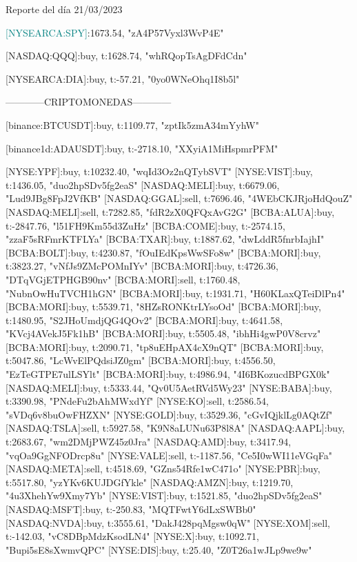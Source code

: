 \documentclass[a4paper]{article}
\begin{document}
Reporte del día 21/03/2023

\begin{tcolorbox}[title=Índices]

\textcolor{teal}{ [NYSEARCA:SPY]}:1673.54, "zA4P57Vyxl3WvP4E"

[NASDAQ:QQQ]:buy, t:1628.74, "whRQopTsAgDFdCdn"

[NYSEARCA:DIA]:buy, t:-57.21, "0yo0WNeOhq1I8b5l"

\end{tcolorbox}

------------CRIPTOMONEDAS------------

[binance:BTCUSDT]:buy, t:1109.77, "zptIk5zmA34mYyhW"

[binance1d:ADAUSDT]:buy, t:-2718.10, "XXyiA1MiHspmrPFM"

[NYSE:YPF]:buy, t:10232.40, "wqId3Oz2nQTybSVT"
[NYSE:VIST]:buy, t:1436.05, "duo2hpSDv5fg2eaS"
[NASDAQ:MELI]:buy, t:6679.06, "Lud9JBg8FpJ2VfKB"
[NASDAQ:GGAL]:sell, t:7696.46, "4WEbCKJRjoHdQouZ"
[NASDAQ:MELI]:sell, t:7282.85, "fdR2zX0QFQxAvG2G"
[BCBA:ALUA]:buy, t:-2847.76, "l51FH9Km55d3ZuHz"
[BCBA:COME]:buy, t:-2574.15, "zzaF5sRFmrKTFLYa"
[BCBA:TXAR]:buy, t:1887.62, "dwLddR5fnrbIajhI"
[BCBA:BOLT]:buy, t:4230.87, "fOuIEdKpsWwSFo8w"
[BCBA:MORI]:buy, t:3823.27, "vNfJs9ZMcPOMnIYv"
[BCBA:MORI]:buy, t:4726.36, "DTqVGjETPHGB90nv"
[BCBA:MORI]:sell, t:1760.48, "NubnOwHuTVCH1hGN"
[BCBA:MORI]:buy, t:1931.71, "H60KLaxQTeiDlPn4"
[BCBA:MORI]:buy, t:5539.71, "8HZsRONKtrLYsoOd"
[BCBA:MORI]:buy, t:1480.95, "S2JHoUmdjQG4QOv2"
[BCBA:MORI]:buy, t:4641.58, "KVcj4AVekJ5Fk1hB"
[BCBA:MORI]:buy, t:5505.48, "ibhHi4gwP0V8crvz"
[BCBA:MORI]:buy, t:2090.71, "tp8uEHpAX4cX9nQT"
[BCBA:MORI]:buy, t:5047.86, "LcWvElPQdsiJZ0gm"
[BCBA:MORI]:buy, t:4556.50, "EzTeGTPE7ulLSYlt"
[BCBA:MORI]:buy, t:4986.94, "4I6BKozucdBPGX0k"
[NASDAQ:MELI]:buy, t:5333.44, "Qv0U5AetRVd5Wy23"
[NYSE:BABA]:buy, t:3390.98, "PNdeFu2bAhMWxdYf"
[NYSE:KO]:sell, t:2586.54, "sVDq6v8buOwFHZXN"
[NYSE:GOLD]:buy, t:3529.36, "cGvIQjklLg0AQtZf"
[NASDAQ:TSLA]:sell, t:5927.58, "K9N8aLUNu63P8l8A"
[NASDAQ:AAPL]:buy, t:2683.67, "wm2DMjPWZ45z0Jra"
[NASDAQ:AMD]:buy, t:3417.94, "vqOa9GgNFODrcp8u"
[NYSE:VALE]:sell, t:-1187.56, "Ce5I0wWI11eVGqFa"
[NASDAQ:META]:sell, t:4518.69, "GZns54Rfe1wC471o"
[NYSE:PBR]:buy, t:5517.80, "yzYKv6KUJDGfYkle"
[NASDAQ:AMZN]:buy, t:1219.70, "4u3XhehYw9Xmy7Yb"
[NYSE:VIST]:buy, t:1521.85, "duo2hpSDv5fg2eaS"
[NASDAQ:MSFT]:buy, t:-250.83, "MQTFwtY6dLxSWBb0"
[NASDAQ:NVDA]:buy, t:3555.61, "DakJ428pqMgsw0qW"
[NYSE:XOM]:sell, t:-142.03, "vC8DBpMdzKsodLN4"
[NYSE:X]:buy, t:1092.71, "Bupi5sE8sXwmvQPC"
[NYSE:DIS]:buy, t:25.40, "Z0T26a1wJLp9we9w"
\end{document}
